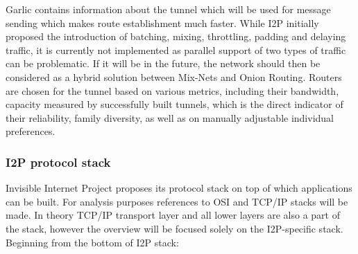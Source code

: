 Garlic contains information about the tunnel which will be used for message sending which makes route establishment much faster.
While I2P initially proposed the introduction of batching, mixing, throttling, padding and delaying traffic, it is currently not implemented as parallel support of two types of traffic can be problematic. If it will be in the future, the network should then be considered as a hybrid solution between Mix-Nets and Onion Routing. 
Routers are chosen for the tunnel based on various metrics, including their bandwidth, capacity measured by successfully built tunnels, which is the direct indicator of their reliability, family diversity, as well as on manually adjustable individual preferences.

\subsubsection{I2P protocol stack}
Invisible Internet Project proposes its protocol stack on top of which applications can be built. For analysis purposes references to OSI and TCP/IP stacks will be made. In theory TCP/IP transport layer and all lower layers are also a part of the stack, however the overview will be focused solely on the I2P-specific stack. Beginning from the bottom of I2P stack:
